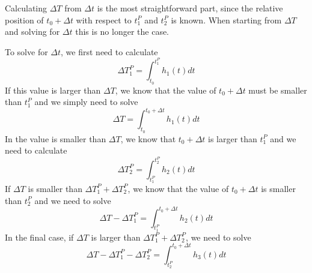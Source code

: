 \documentclass[a4paper,11pt]{article}
\begin{document}
	Calculating $\Delta T$ from $\Delta t$ is the most straightforward part, since the 
	relative position of $t_0 + \Delta t$ with respect to $t_1^P$ and $t_2^P$ is known.
	When starting from $\Delta T$ and solving for $\Delta t$ this is no longer the case.

	To solve for $\Delta t$, we first need to calculate
	\[ \Delta T_1^P = \int_{t_0}^{t_1^P} h_1(t) dt \]
	If this value is larger than $\Delta T$, we know that the value of $t_0 + \Delta t$ must
	be smaller than $t_1^P$ and we simply need to solve
	\[ \Delta T = \int_{t_0}^{t_0 + \Delta t} h_1(t) dt \]
	In the value is smaller than $\Delta T$, we know that $t_0 + \Delta t$ is larger than
	$t_1^P$ and we need to calculate
	\[ \Delta T_2^P = \int_{t_1^P}^{t_2^P} h_2(t) dt \]
	If $\Delta T$ is smaller than $\Delta T_1^P + \Delta T_2^P$, we know that the value of 
	$t_0 + \Delta t$ is smaller than $t_2^P$ and we need to solve
	\[ \Delta T - \Delta T_1^P = \int_{t_1^P}^{t_0 + \Delta t} h_2(t) dt \]
	In the final case, if $\Delta T$ is larger than $\Delta T_1^P + \Delta T_2^P$, we
	need to solve
	\[ \Delta T - \Delta T_1^P - \Delta T_2^P = \int_{t_2^P}^{t_0 + \Delta t} h_3(t) dt \]
\end{document}
